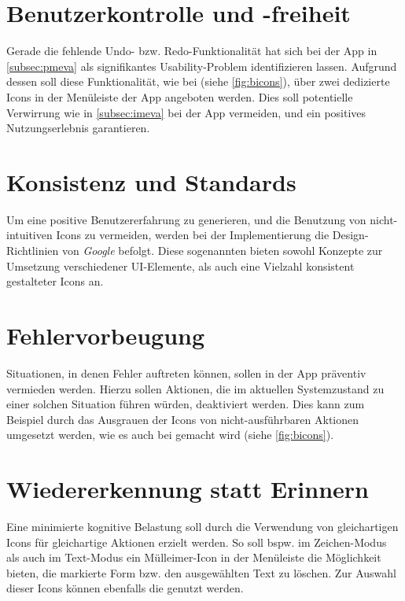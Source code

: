 \section{Benutzerkontrolle und -freiheit}
Gerade die fehlende Undo- bzw. Redo-Funktionalität hat sich bei der App \pm{} in \autoref{subsec:pmeva} als signifikantes Usability-Problem identifizieren lassen.
Aufgrund dessen soll diese Funktionalität, wie bei \mm{} (siehe \autoref{fig:bicons}), über zwei dedizierte Icons in der Menüleiste der App angeboten werden. 
Dies soll potentielle Verwirrung wie in \autoref{subsec:imeva} bei der App \im{} vermeiden, und ein positives Nutzungserlebnis garantieren.

\section{Konsistenz und Standards}
Um eine positive Benutzererfahrung zu generieren, und die Benutzung von nicht-intuitiven Icons zu vermeiden, werden bei der Implementierung die Design-Richtlinien von \emph{Google} befolgt.
Diese sogenannten \mg{} bieten sowohl Konzepte zur Umsetzung verschiedener UI-Elemente, als auch eine Vielzahl konsistent gestalteter Icons an.

\section{Fehlervorbeugung}
Situationen, in denen Fehler auftreten können, sollen in der App präventiv vermieden werden.
Hierzu sollen Aktionen, die im aktuellen Systemzustand zu einer solchen Situation führen würden, deaktiviert werden.
Dies kann zum Beispiel durch das Ausgrauen der Icons von nicht-ausführbaren Aktionen umgesetzt werden, wie es auch bei \mm{} gemacht wird (siehe \autoref{fig:bicons}).

\section{Wiedererkennung statt Erinnern}
Eine minimierte kognitive Belastung soll durch die Verwendung von gleichartigen Icons für gleichartige Aktionen erzielt werden.
So soll bspw. im Zeichen-Modus als auch im Text-Modus ein Mülleimer-Icon in der Menüleiste die Möglichkeit bieten, die markierte Form bzw. den ausgewählten Text zu löschen.
Zur Auswahl dieser Icons können ebenfalls die \mg{} genutzt werden.

